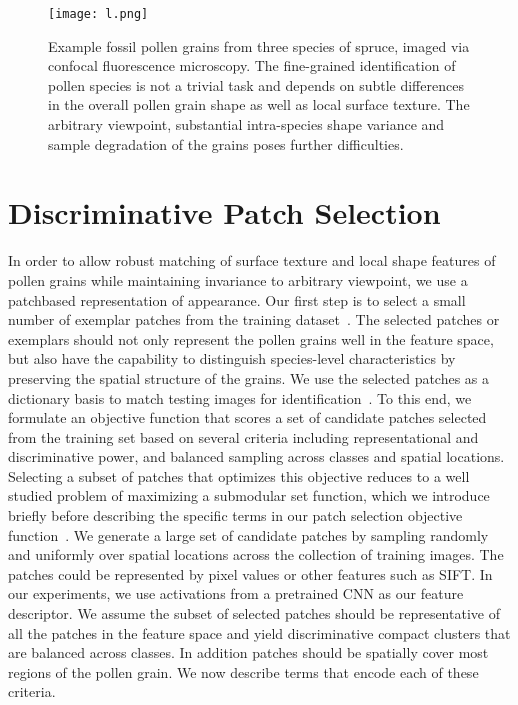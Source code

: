 \documentclass[10pt,twocolumn,letterpaper]{article}
\begin{document}
\begin{figure*}
\begin{center}
   \texttt{[image: l.png]}
\end{center}
   \caption{Example fossil pollen grains from three species of spruce, imaged via confocal fluorescence microscopy. The fine-grained identification of pollen species is not a trivial task and depends on subtle differences in the overall pollen grain shape as well as local surface texture. The arbitrary viewpoint, substantial intra-species shape variance and sample degradation of the grains poses further difficulties.}
\label{fig:short}
\end{figure*}

\section{Discriminative Patch Selection}

In order to allow robust matching of surface texture and local shape features of pollen grains while maintaining invariance to arbitrary viewpoint, we use a patchbased representation of appearance. Our first step is to select a small number of exemplar patches from the training dataset~\cite{horn1981determining}. The selected patches or exemplars should not only represent the pollen grains well in the feature space, but also have the capability to distinguish species-level characteristics by preserving the spatial structure of the grains. We use the selected patches as a dictionary basis to match testing images for identification~\cite{fikes1971strips}.
To this end, we formulate an objective function that scores a set of candidate patches selected from the training set based on several criteria including representational and discriminative power, and balanced sampling across classes and spatial locations. Selecting a subset of patches that optimizes this objective reduces to a well studied problem of maximizing a submodular set function, which we introduce briefly before describing the specific terms in our patch selection objective function~\cite{Kong_2016_CVPR_Workshops}.
We generate a large set of candidate patches by sampling randomly and uniformly over spatial locations across the collection of training images. The patches could be represented by pixel values or other features such as SIFT. In our experiments, we use activations from a pretrained CNN as our feature descriptor. We assume the subset of selected patches should be representative of all the patches in the feature space and yield discriminative compact clusters that are balanced across classes. In addition patches should be spatially cover most regions of the pollen grain. We now describe terms that encode each of these criteria.
\end{document}
